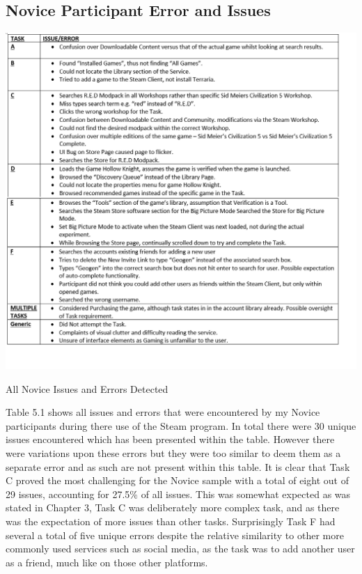 \subsection{Novice Participant Error and Issues}
\begin{table}[H]
\includegraphics[width=\linewidth]{Screenshots/ErrorRecords/Novice/noviceAllErrors.png}
\label{NoviceErrorsList}
\caption{All Novice Issues and Errors Detected}
\end{table}

Table 5.1 shows all issues and errors that were encountered by my Novice participants during there use of the Steam program. In total there were 30 unique issues encountered which has been presented within the table. However there were variations upon these errors but they were too similar to deem them as a separate error and as such are not present within this table. It is clear that Task C proved the most challenging for the Novice sample with a total of eight out of 29 issues, accounting for 27.5\% of all issues. This was somewhat expected as was stated in Chapter 3, Task C was deliberately more complex task, and as there was the expectation of more issues than other tasks.  Surprisingly Task F had several a total of five unique errors despite the relative similarity to other more commonly used services such as social media, as the task was to add another user as a friend, much like on those other platforms.

